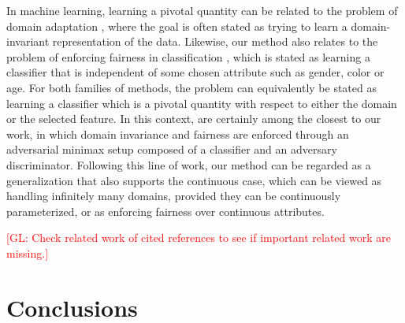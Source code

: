 \documentclass[twocolumn,superscriptaddress,aps]{revtex4-1}
\newcommand{\glnote}[1]{\textcolor{red}{[GL: #1]}}
\theoremstyle{plain}
\begin{document}
In machine learning, learning a pivotal quantity can be related to the problem
of domain adaptation
\citep{blitzer2006domain,pan2011domain,gopalan2011domain,gong2013connecting,baktashmotlagh2013unsupervised,ganin2014unsupervised},
where the goal is often stated as trying to learn a domain-invariant
representation of the data. Likewise, our method also relates to the problem of
enforcing fairness in classification \citep{zemel2013learning,EdwardsS15}, which
is stated as learning a classifier that is independent of some chosen attribute
such as gender, color or age. For both families of methods, the problem can
equivalently be stated as learning a classifier which is a pivotal quantity with
respect to either the domain or the selected feature. In this context,
\citep{ganin2014unsupervised,EdwardsS15} are certainly among the closest to our
work, in which domain invariance and fairness are enforced through an
adversarial minimax setup composed of a classifier and an adversary
discriminator. Following this line of work, our method can be regarded as a
generalization that also supports the continuous case, which can be viewed as
handling infinitely many domains, provided they can be continuously
parameterized, or as enforcing fairness over continuous attributes.

\glnote{Check related work of cited references to see if important related work are missing.}



\section{Conclusions}



\begin{acknowledgments}
\end{acknowledgments}




\end{document}
